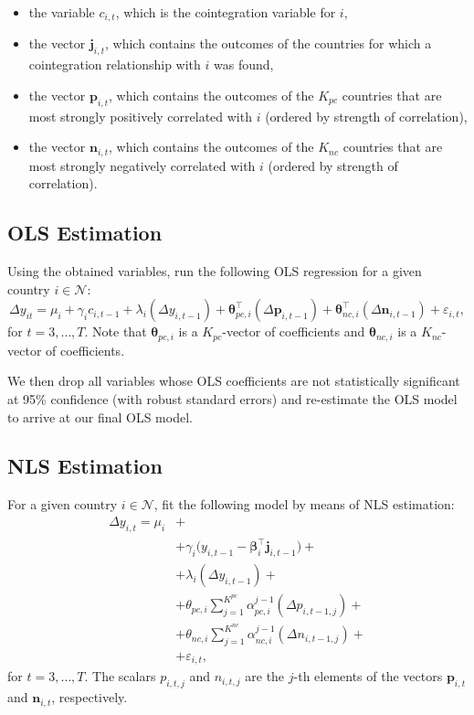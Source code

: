 \documentclass{article}
\begin{document}
\begin{itemize}
    \item the variable $c_{i,t}$, which is the cointegration variable for $i$,
    \item the vector $\mathbf{j}_{i,t}$, which contains the outcomes of the countries for which a cointegration relationship with $i$ was found,
    \item the vector $\mathbf{p}_{i,t}$, which contains the outcomes of the $K_{pc}$ countries that are most strongly positively correlated with $i$ (ordered by strength of correlation),
    \item the vector $\mathbf{n}_{i,t}$, which contains the outcomes of the $K_{nc}$ countries that are most strongly negatively correlated with $i$ (ordered by strength of correlation).
\end{itemize}

\subsection{OLS Estimation} \label{sec:ols}
Using the obtained variables, run the following OLS regression for a given country $i \in \mathcal{N}$:
 \begin{equation}
     \Delta y_{it} 
     =
     \mu_i +
     \gamma_i  c_{i,t-1} +
     \lambda_i (\Delta y_{i, t-1}) +
     \bm{\theta}_{pc,i}^\top (\Delta \mathbf{p}_{i,t-1}) +
     \bm{\theta}_{nc,i}^\top (\Delta \mathbf{n}_{i,t-1}) +
     \varepsilon_{i,t}, 
     \label{eq:ols}
 \end{equation}
for $t=3,\dots,T$. Note that $\bm{\theta}_{pc,i}$ is a $K_{pc}$-vector of coefficients and $\bm{\theta}_{nc,i}$ is a $K_{nc}$-vector of coefficients.

We then drop all variables whose OLS coefficients are not statistically significant at 95\% confidence (with robust standard errors) and re-estimate the OLS model to arrive at our final OLS model.

\subsection{NLS Estimation} \label{sec:nls}
For a given country $i \in \mathcal{N}$, fit the following model by means of NLS estimation:
 \begin{equation}
 \begin{split}
     \Delta y_{i,t}
     =
     \mu_i &+ \\
     &+ \gamma_i \Big( y_{i,t-1} - \bm{\beta}_i^\top \mathbf{j}_{i,t-1}  \Big) + \\
     &+ \lambda_i (\Delta y_{i, t-1}) + \\
     &+ \theta_{pc,i} \sum_{j=1}^{K^{pc}} \alpha_{pc,i}^{j-1} (\Delta p_{i,t-1,j}) + \\
     &+ \theta_{nc,i} \sum_{j=1}^{K^{nc}} \alpha_{nc,i}^{j-1} (\Delta n_{i,t-1,j}) + \\
     &+ \varepsilon_{i,t},
     \label{eq:nls}
 \end{split}
 \end{equation}
for $t=3,\dots,T$. The scalars $p_{i,t,j}$ and $n_{i,t,j}$ are the $j$-th elements of the vectors $\mathbf{p}_{i,t}$ and $\mathbf{n}_{i,t}$, respectively.
\end{document}
